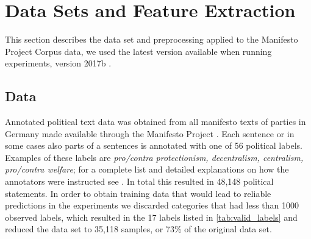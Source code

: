 \documentclass[runningheads,a4paper]{article}
\begin{document}
\section{Data Sets and Feature Extraction}\label{sec:data}
%
This section describes the data set and preprocessing applied to the Manifesto Project Corpus data, we used the latest version available when running experiments, version 2017b \cite{manifesto}. 
\subsection{Data}
Annotated political text data was obtained from all manifesto texts of parties in Germany made available through the Manifesto Project \cite{manifesto}. 
Each sentence or in some cases also parts of a sentences is annotated with one of 56 political labels. Examples of these labels are {\em pro/contra protectionism, decentralism, centralism, pro/contra welfare}; for a complete list and detailed explanations on how the annotators were instructed see \cite{leftright}. In total this resulted in 48,148 political statements. In order to obtain training data that would lead to reliable predictions in the experiments we discarded categories that had less than 1000 observed labels, which resulted in the 17 labels listed in \autoref{tab:valid_labels} and reduced the data set to 35,118 samples, or 73\% of the original data set.
\end{document}
